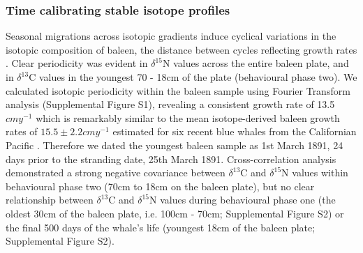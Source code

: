 \documentclass[a4paper,12pt]{article}
\begin{document}
\subsubsection{Time calibrating stable isotope profiles}
Seasonal migrations across isotopic gradients induce cyclical variations in the isotopic composition of baleen, the distance between cycles reflecting growth rates \cite{hobson1998stable,busquets2017estimating}. 
Clear periodicity was evident in $\delta^{15}$N values across the entire baleen plate, and in $\delta^{13}$C values in the youngest 70 - 18cm of the plate (behavioural phase two). 
We calculated isotopic periodicity within the baleen sample using Fourier Transform analysis \cite{cardona2017temporal} (Supplemental Figure S1), revealing a consistent growth rate of 13.5$cmy^{-1}$ which is remarkably similar to the mean isotope-derived baleen growth rates of $15.5 \pm 2.2cmy^{-1}$ estimated for six recent blue whales from the Californian Pacific \cite{busquets2017estimating}.  
Therefore we dated the youngest baleen sample as 1st March 1891, 24 days prior to the stranding date, 25th March 1891. 
Cross-correlation analysis demonstrated a strong negative covariance between $\delta^{13}$C and $\delta^{15}$N values within behavioural phase two (70cm to 18cm on the baleen plate), but no clear relationship between $\delta^{13}$C and $\delta^{15}$N values during behavioural phase one (the oldest 30cm of the baleen plate, i.e. 100cm - 70cm; Supplemental Figure S2) or the final 500 days of the whale's life (youngest 18cm of the baleen plate; Supplemental Figure S2).
 
\end{document}
